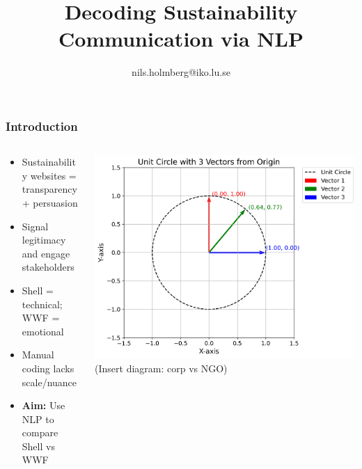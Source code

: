 \documentclass[aspectratio=1610]{beamer}
\title{Decoding Sustainability\\Communication via NLP}
\author{nils.holmberg@iko.lu.se}
\begin{document}
\let\olditem\item
\renewcommand{\item}{\olditem\vspace{8pt}} %
\setlength{\itemsep}{8pt}  %
\setlength{\parskip}{8pt}  %

\begin{frame}[plain]
  \titlepage
\end{frame}

\begin{frame}
  \frametitle{Introduction}
  \begin{columns}[t]
    \begin{column}[t]{0.5\textwidth}
      \begin{itemize}
        \item Sustainability websites = transparency + persuasion
        \item Signal legitimacy and engage stakeholders
        \item Shell = technical; WWF = emotional
        \item Manual coding lacks scale/nuance
        \item \textbf{Aim:} Use NLP to compare Shell vs WWF
      \end{itemize}
    \end{column}
    \begin{column}[t]{0.5\textwidth}
      \vspace*{0pt}
      \includegraphics[width=\linewidth]{../../fig/unit_circle_vectors.png}
      (Insert diagram: corp vs NGO)
    \end{column}
  \end{columns}
\end{frame}
\end{document}
